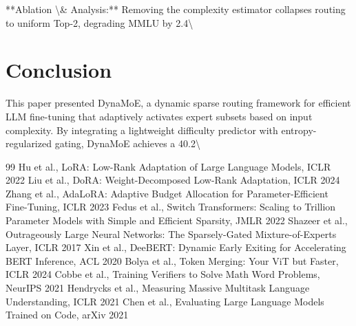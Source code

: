 \documentclass[11pt,a4paper]{article}
\begin{document}
**Ablation \textbackslash{}& Analysis:** Removing the complexity estimator collapses routing to uniform Top-2, degrading MMLU by 2.4\textbackslash{}%

\section{Conclusion}
This paper presented DynaMoE, a dynamic sparse routing framework for efficient LLM fine-tuning that adaptively activates expert subsets based on input complexity. By integrating a lightweight difficulty predictor with entropy-regularized gating, DynaMoE achieves a 40.2\textbackslash{}%


\begin{thebibliography}{99}
 Hu et al., LoRA: Low-Rank Adaptation of Large Language Models, ICLR 2022
 Liu et al., DoRA: Weight-Decomposed Low-Rank Adaptation, ICLR 2024
 Zhang et al., AdaLoRA: Adaptive Budget Allocation for Parameter-Efficient Fine-Tuning, ICLR 2023
 Fedus et al., Switch Transformers: Scaling to Trillion Parameter Models with Simple and Efficient Sparsity, JMLR 2022
 Shazeer et al., Outrageously Large Neural Networks: The Sparsely-Gated Mixture-of-Experts Layer, ICLR 2017
 Xin et al., DeeBERT: Dynamic Early Exiting for Accelerating BERT Inference, ACL 2020
 Bolya et al., Token Merging: Your ViT but Faster, ICLR 2024
 Cobbe et al., Training Verifiers to Solve Math Word Problems, NeurIPS 2021
 Hendrycks et al., Measuring Massive Multitask Language Understanding, ICLR 2021
 Chen et al., Evaluating Large Language Models Trained on Code, arXiv 2021
\end{thebibliography}
\end{document}
